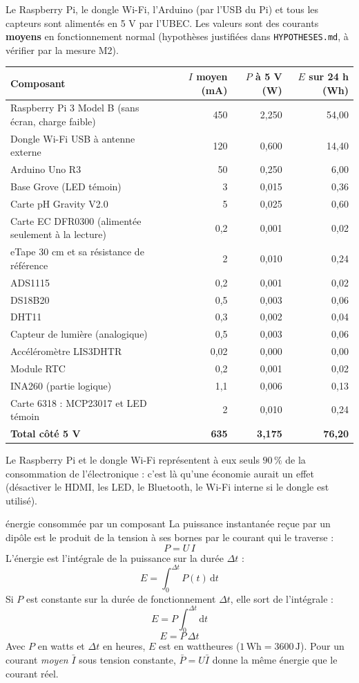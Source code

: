 \documentclass[11pt,a4paper]{article}
\newcommand{\U}[1]{\,\mathrm{#1}}
\begin{document}
Le Raspberry Pi, le dongle Wi-Fi, l'Arduino (par l'USB du Pi) et tous les capteurs sont alimentés en 5 V par l'UBEC. Les valeurs sont des courants \textbf{moyens} en fonctionnement normal (hypothèses justifiées dans \texttt{HYPOTHESES.md}, à vérifier par la mesure M2).

\begin{center}
\small
\begin{tabularx}{\linewidth}{>{\raggedright\arraybackslash}X r r r}
\toprule
\textbf{Composant} & \textbf{$I$ moyen (mA)} & \textbf{$P$ à 5 V (W)} & \textbf{$E$ sur 24 h (Wh)} \\
\midrule
Raspberry Pi 3 Model B (sans écran, charge faible) & 450 & 2,250 & 54,00 \\
Dongle Wi-Fi USB à antenne externe & 120 & 0,600 & 14,40 \\
Arduino Uno R3 & 50 & 0,250 & 6,00 \\
Base Grove (LED témoin) & 3 & 0,015 & 0,36 \\
Carte pH Gravity V2.0 & 5 & 0,025 & 0,60 \\
Carte EC DFR0300 (alimentée seulement à la lecture) & 0,2 & 0,001 & 0,02 \\
eTape 30 cm et sa résistance de référence & 2 & 0,010 & 0,24 \\
ADS1115 & 0,2 & 0,001 & 0,02 \\
DS18B20 & 0,5 & 0,003 & 0,06 \\
DHT11 & 0,3 & 0,002 & 0,04 \\
Capteur de lumière (analogique) & 0,5 & 0,003 & 0,06 \\
Accéléromètre LIS3DHTR & 0,02 & 0,000 & 0,00 \\
Module RTC & 0,2 & 0,001 & 0,02 \\
INA260 (partie logique) & 1,1 & 0,006 & 0,13 \\
Carte 6318 : MCP23017 et LED témoin & 2 & 0,010 & 0,24 \\
\midrule
\textbf{Total côté 5 V} & \textbf{635} & \textbf{3,175} & \textbf{76,20} \\
\bottomrule
\end{tabularx}
\end{center}

Le Raspberry Pi et le dongle Wi-Fi représentent à eux seuls $90\U{\%}$ de la consommation de l'électronique : c'est là qu'une économie aurait un effet (désactiver le HDMI, les LED, le Bluetooth, le Wi-Fi interne si le dongle est utilisé).

\begin{demo}{énergie consommée par un composant}
La puissance instantanée reçue par un dipôle est le produit de la tension à ses bornes par le courant qui le traverse :
\[
P = U \, I
\]
L'énergie est l'intégrale de la puissance sur la durée $\Delta t$ :
\[
E = \int_{0}^{\Delta t} P(t)\,\mathrm{d}t
\]
Si $P$ est constante sur la durée de fonctionnement $\Delta t$, elle sort de l'intégrale :
\[
E = P \int_{0}^{\Delta t} \mathrm{d}t
\]
\[
E = P \, \Delta t
\]
Avec $P$ en watts et $\Delta t$ en heures, $E$ est en wattheures ($1\U{Wh} = 3600\U{J}$). Pour un courant \emph{moyen} $\bar I$ sous tension constante, $\bar P = U \bar I$ donne la même énergie que le courant réel.
\end{demo}
\end{document}
